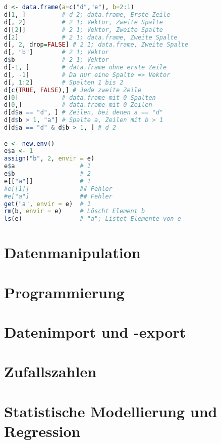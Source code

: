 \documentclass[10pt,twocolumn]{scrartcl}
\begin{document}
\begin{lstlisting}[language=R]
d <- data.frame(a=c("d","e"), b=2:1)
d[1, ]          # d 2; data.frame, Erste Zeile
d[, 2]          # 2 1; Vektor, Zweite Spalte
d[[2]]          # 2 1; Vektor, Zweite Spalte
d[2]            # 2 1; data.frame, Zweite Spalte
d[, 2, drop=FALSE] # 2 1; data.frame, Zweite Spalte
d[, "b"]        # 2 1; Vektor
d$b             # 2 1; Vektor
d[-1, ]         # data.frame ohne erste Zeile
d[, -1]         # Da nur eine Spalte => Vektor
d[, 1:2]        # Spalten 1 bis 2
d[c(TRUE, FALSE),] # Jede zweite Zeile
d[0]            # data.frame mit 0 Spalten
d[0,]           # data.frame mit 0 Zeilen
d[d$a == "d", ] # Zeilen, bei denen a == "d"
d[d$b > 1, "a"] # Spalte a, Zeilen mit b > 1
d[d$a == "d" & d$b > 1, ] # d 2

e <- new.env()
e$a <- 1
assign("b", 2, envir = e)
e$a                  # 1
e$b                  # 2
e[["a"]]             # 1
#e[[1]]              ## Fehler
#e["a"]              ## Fehler
get("a", envir = e)  # 1
rm(b, envir = e)     # Löscht Element b
ls(e)                # "a"; Listet Elemente von e
\end{lstlisting}

\section{Datenmanipulation}


\section{Programmierung}




\section{Datenimport und -export}

\section{Zufallszahlen}


\section*{Statistische Modellierung und Regression}
\end{document}
